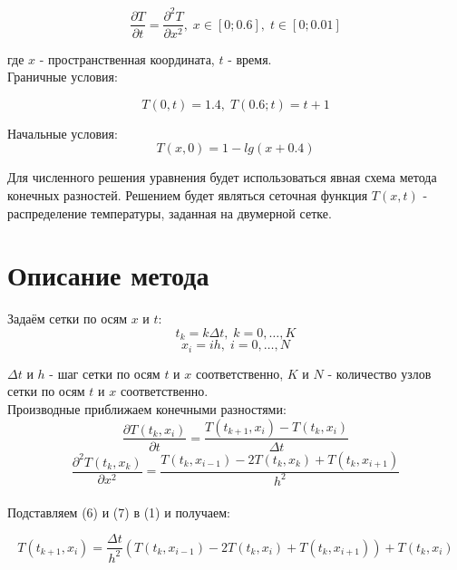 \documentclass[a4paper,fontsize=14pt]{article}
\begin{document}
	\begin{equation}
	\frac{\partial T}{\partial t} = \frac{\partial^2 T}{\partial x^2}, \; x \in [0; 0.6], \; t \in [0; 0.01]
	\end{equation}

	где $x$ - пространственная координата, $t$ - время.\\
	
	Граничные условия:
	
	\begin{equation}
	T(0,t)=1.4, \; T(0.6;t)=t+1
	\end{equation}
	
	Начальные условия:
	\begin{equation}
	T(x, 0) = 1-lg(x+0.4)
	\end{equation}
	
	
	Для численного решения уравнения будет использоваться явная схема метода конечных разностей. Решением будет являться сеточная функция $T(x, t)$ - распределение температуры, заданная на двумерной сетке.

	\section{Описание метода}
	
	Задаём сетки по осям $x$ и $t$:
	\begin{equation}
		t_k = k\Delta t,\; k=0,\dots,K	
	\end{equation}
	\begin{equation}
		x_i=ih, \; i=0,\dots,N
	\end{equation}
	
	$\Delta t$ и $h$ - шаг сетки по осям $t$ и $x$ соответственно, $K$ и $N$ - количество узлов сетки по осям $t$ и $x$ соответственно. \\
	
	Производные приближаем конечными разностями: \\
	\begin{equation}
		\frac{\partial T(t_k, x_i)}{\partial t} = \frac{T(t_{k+1}, x_i) - T(t_k, x_i)}{\Delta t}
	\end{equation}
	\begin{equation}
		\frac{\partial^2 T(t_k, x_k)}{\partial x^2} = \frac{T(t_k, x_{i-1}) - 2T(t_k, x_k) + T(t_k, x_{i+1})}{h^2}
	\end{equation} \\
	
	Подставляем (6) и (7) в (1) и получаем:
	
	\begin{equation}
		T(t_{k+1}, x_i) = \frac{\Delta t}{h^2}(T(t_k, x_{i-1}) - 2T(t_k, x_i) + T(t_k, x_{i+1})) + T(t_k, x_i)
	\end{equation} \\
	
\end{document}
